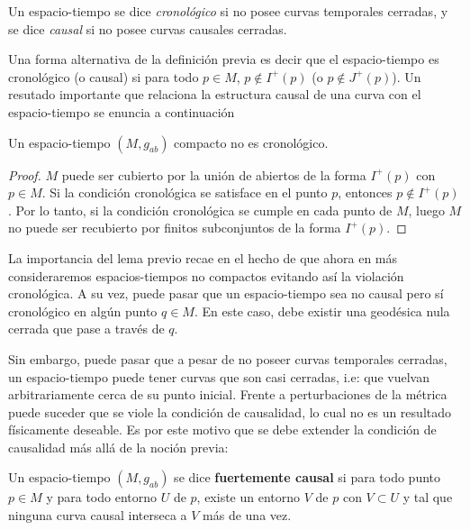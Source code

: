 \begin{definition}
Un espacio-tiempo se dice \textit{cronológico} si no posee curvas temporales cerradas, y se dice \textit{causal} si no posee curvas causales cerradas.
\end{definition}

Una forma alternativa de la definición previa es decir que el espacio-tiempo es cronológico (o causal) si para todo $p\in M$, $p\notin I^+(p)$ (o $p\notin J^+(p)$). Un resutado importante que relaciona la estructura causal de una curva con el espacio-tiempo se enuncia a continuación

\begin{lemma}
Un espacio-tiempo $(M,g_{ab})$ compacto no es cronológico.
\end{lemma}
\begin{proof}
$M$ puede ser cubierto por la unión de abiertos de la forma $I^+(p)$ con $p\in M$. Si la condición cronológica se satisface en el punto $p$,  entonces $p\notin I^+(p)$. Por lo tanto, si la condición cronológica se cumple en cada punto de $M$, luego $M$ no puede ser recubierto por finitos subconjuntos de la forma $I^+(p)$.
\end{proof}

La importancia del lema previo recae en el hecho de que ahora en más consideraremos espacios-tiempos no compactos evitando así la violación cronológica. A su vez, puede pasar que un espacio-tiempo sea no causal pero sí cronológico en algún punto $q\in M$. En este caso, debe existir una geodésica nula cerrada que pase a través de $q$.

Sin embargo, puede pasar que a pesar de no poseer curvas temporales cerradas, un espacio-tiempo puede tener curvas que son casi cerradas, i.e: que vuelvan arbitrariamente cerca de su punto inicial. Frente a perturbaciones de la métrica puede suceder que se viole la condición de causalidad, lo cual no es un resultado físicamente deseable. Es por este motivo que se debe extender la condición de causalidad más allá de la noción previa:

\begin{definition}
Un espacio-tiempo $(M,g_{ab})$ se dice \textbf{fuertemente causal} si para todo punto $p\in M$ y para todo entorno $U$ de $p$, existe un entorno $V$ de $p$ con $V\subset U$ y tal que ninguna curva causal interseca a $V$ más de una vez.
\end{definition}


